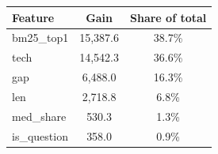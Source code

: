 \begin{tabular}{lSS}
\toprule
\textbf{Feature} & \textbf{Gain} & \textbf{Share of total} \\
\midrule
bm25\_top1 & 15,387.6 & 38.7\% \\
tech & 14,542.3 & 36.6\% \\
gap & 6,488.0 & 16.3\% \\
len & 2,718.8 & 6.8\% \\
med\_share & 530.3 & 1.3\% \\
is\_question & 358.0 & 0.9\% \\
\bottomrule
\end{tabular}
